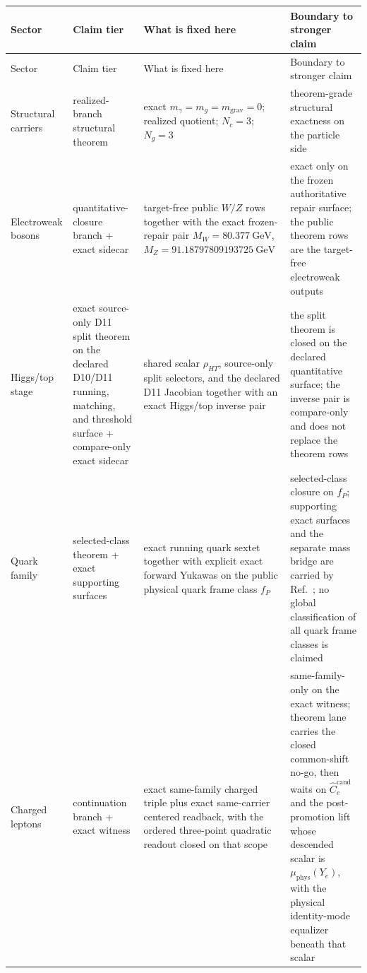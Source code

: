 \scriptsize
\setlength{\tabcolsep}{2pt}
\begin{longtable}{@{}>{\raggedright\arraybackslash}p{}>{\raggedright\arraybackslash}p{}>{\raggedright\arraybackslash}p{}>{\raggedright\arraybackslash}p{}@{}}
\toprule
Sector & Claim tier & What is fixed here & Boundary to stronger claim \\
\midrule
\endfirsthead
\toprule
Sector & Claim tier & What is fixed here & Boundary to stronger claim \\
\midrule
\endhead
\bottomrule
\endfoot
Structural carriers & realized-branch structural theorem & exact \(m_\gamma=m_g=m_{\mathrm{grav}}=0\); realized quotient; \(N_c=3\); \(N_g=3\) & theorem-grade structural exactness on the particle side \\
Electroweak bosons & quantitative-closure branch + exact sidecar & target-free public \(W/Z\) rows together with the exact frozen-repair pair \(M_W=80.377~\mathrm{GeV}\), \(M_Z=91.18797809193725~\mathrm{GeV}\) & exact only on the frozen authoritative repair surface; the public theorem rows are the target-free electroweak outputs \\
Higgs/top stage & exact source-only D11 split theorem on the declared D10/D11 running, matching, and threshold surface + compare-only exact sidecar & shared scalar \(\rho_{HT}\), source-only split selectors, and the declared D11 Jacobian together with an exact Higgs/top inverse pair & the split theorem is closed on the declared quantitative surface; the inverse pair is compare-only and does not replace the theorem rows \\
Quark family & selected-class theorem + exact supporting surfaces & exact running quark sextet together with explicit exact forward Yukawas on the public physical quark frame class \(f_P\) & selected-class closure on \(f_P\); supporting exact surfaces and the separate mass bridge are carried by Ref.~\cite{ophparticles}; no global classification of all quark frame classes is claimed \\
Charged leptons & continuation branch + exact witness & exact same-family charged triple plus exact same-carrier centered readback, with the ordered three-point quadratic readout closed on that scope & same-family-only on the exact witness; theorem lane carries the closed common-shift no-go, then waits on \(\widehat C_e^{\mathrm{cand}}\) and the post-promotion lift whose descended scalar is \(\mu_{\mathrm{phys}}(Y_e)\), with the physical identity-mode equalizer beneath that scalar \\

\end{longtable}
